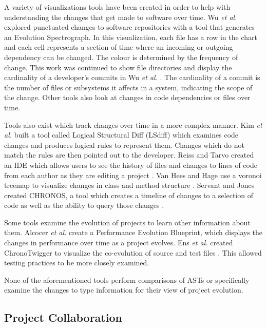 A variety of visualizations tools have been created in order to help with understanding the changes that get made to software over time. Wu \textit{et al.} \cite{wu2004a} explored punctuated changes to software repositories with a tool that generates an Evolution Spectrograph. In this visualization, each file has a row in the chart and each cell represents a section of time where an incoming or outgoing dependency can be changed. The colour is determined by the frequency of change. This work was continued to show file directories and display the cardinality of a developer's commits in Wu \textit{et al.} \cite{wu2004}. The cardinality of a commit is the number of files or subsystems it affects in a system, indicating the scope of the change. Other tools also look at changes in code dependencies \cite{6980224} or files \cite{6650525, 7332421,voinea2006} over time.

Tools also exist which track changes over time in a more complex manner. Kim \textit{et al.} \cite{Kim:2009:DRS:1555001.1555046} built a tool called Logical Structural Diff (LSdiff) which examines code changes and produces logical rules to represent them. Changes which do not match the rules are then pointed out to the developer. Reiss and Tarvo created an IDE which allows users to see the history of files and changes to lines of code from each author as they are editing a project \cite{6650521}. Van Hees and Hage use a voronoi treemap to visualize changes in class and method structure \cite{7332410}. Servant and Jones created CHRONOS, a tool which creates a timeline of changes to a selection of code as well as the ability to query those changes \cite{6650547}. 

Some tools examine the evolution of projects to learn other information about them. Alcocer \textit{et al.} \cite{6650523} create a Performance Evolution Blueprint, which displays the changes in performance over time as a project evolves. Ens \textit{et al.} created ChronoTwigger to visualize the co-evolution of source and test files \cite{6980223}. This allowed testing practices to be more closely examined.

None of the aforementioned tools perform comparisons of ASTs or specifically examine the changes to type information for their view of project evolution.

\subsection{Project Collaboration}

